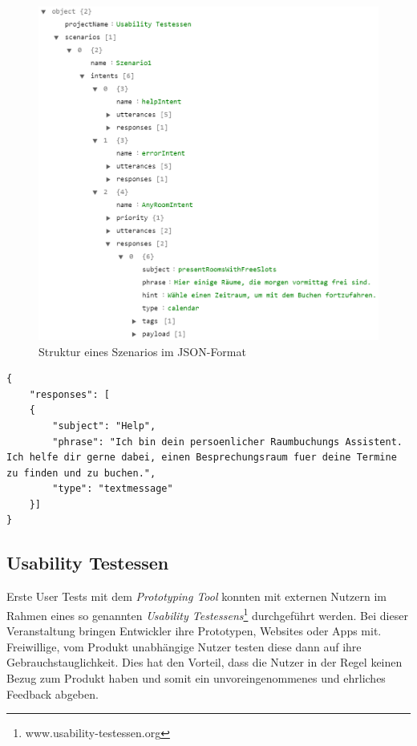 \begin{figure}[H]
    \centering
    \includegraphics[width=1\textwidth]{bilder/json-structure-v2.PNG}
    \caption{Struktur eines Szenarios im \acs{JSON}-Format}
    \label{fig:json-structure}
\end{figure}
\clearpage
\begin{lstlisting}[caption={Beispielhafte Response im \acs{JSON}-Format}, captionpos=b, label={lst:szenario-json}, language=myjson]
{
    "responses": [
    {
        "subject": "Help",
        "phrase": "Ich bin dein persoenlicher Raumbuchungs Assistent. Ich helfe dir gerne dabei, einen Besprechungsraum fuer deine Termine zu finden und zu buchen.",
        "type": "textmessage"
    }]
}

\end{lstlisting}

\subsection{Usability Testessen}
\label{subsec:usability-testessen}

Erste User Tests mit dem \textit{Prototyping Tool} konnten mit externen Nutzern im Rahmen eines so genannten \textit{Usability Testessens}\footnote{www.usability-testessen.org} durchgeführt werden. Bei dieser Veranstaltung bringen Entwickler ihre Prototypen, Websites oder Apps mit. Freiwillige, vom Produkt unabhängige Nutzer testen diese dann auf ihre Gebrauchstauglichkeit. Dies hat den Vorteil, dass die Nutzer in der Regel keinen Bezug zum Produkt haben und somit ein unvoreingenommenes und ehrliches Feedback abgeben. 

